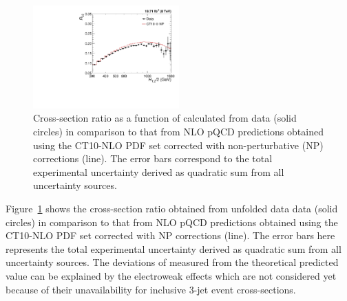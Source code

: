 \begin{figure}[!h]
 \begin{center}
 \includegraphics[width=0.50\textwidth]{Plots_HT_2_150/Sensitivity_ratio_32_CT10_only.pdf}%
 \caption[Cross-section ratio as a function of \httwo calculated from data in comparison to that from NLO pQCD predictions obtained using the CT10-NLO PDF set.]{Cross-section ratio \ratio as a function of \httwo calculated from data (solid circles) in comparison to that from NLO pQCD predictions obtained using the CT10-NLO PDF set corrected with non-perturbative (NP) corrections (line). The error bars correspond to the total experimental uncertainty derived as quadratic sum from all uncertainty sources.}
 \label{fig:ratiosens}
 \end{center}
\end{figure}

Figure~\ref{fig:ratiosens} shows the cross-section ratio \ratio obtained from unfolded data data (solid circles) in comparison to that from NLO pQCD predictions obtained using the CT10-NLO PDF set corrected with NP corrections (line). The error bars here represents the total experimental uncertainty derived as quadratic sum from all uncertainty sources. The deviations of measured \ratio from the theoretical predicted value can be explained by the electroweak effects which are not considered yet because of their unavailability for inclusive 3-jet event cross-sections.


